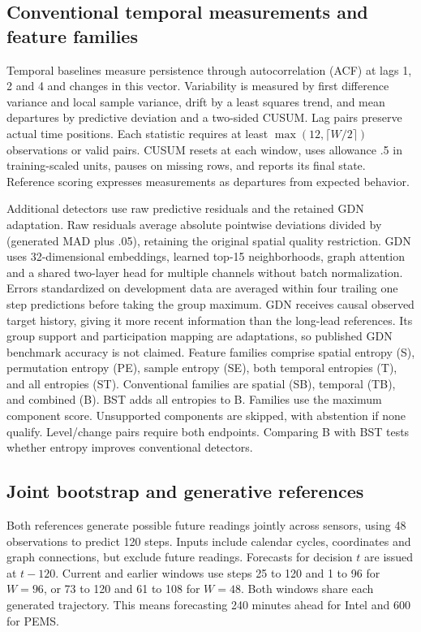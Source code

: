 \documentclass{llncs}
\begin{document}
\subsection{Conventional temporal measurements and feature families}
Temporal baselines measure persistence through autocorrelation (ACF) at lags
1, 2 and 4 and changes in this vector. Variability is measured by first difference
variance and local sample variance, drift by a least squares trend, and mean
departures by predictive deviation and a two-sided CUSUM. Lag pairs preserve
actual time positions. Each statistic requires at least
$\max(12,\lceil W/2\rceil)$ observations or valid pairs. CUSUM resets at each
window, uses allowance .5 in training-scaled units, pauses on missing rows,
and reports its final state. Reference scoring expresses measurements as
departures from expected behavior.

Additional detectors use raw predictive residuals and the retained GDN
adaptation. Raw residuals average absolute pointwise deviations divided by
(generated MAD plus .05), retaining the original spatial quality restriction.
GDN uses 32-dimensional embeddings, learned top-15 neighborhoods, graph
attention and a shared two-layer head for multiple channels without batch
normalization. Errors standardized on development data are averaged within
four trailing one step predictions before taking the group maximum. GDN receives
causal observed target history, giving it more recent information than the
long-lead references. Its group support and participation mapping are
adaptations, so published GDN benchmark accuracy is not claimed.
Feature families comprise spatial entropy (S), permutation entropy (PE),
sample entropy (SE), both temporal entropies (T), and all entropies (ST).
Conventional families are spatial (SB), temporal (TB), and combined (B).
BST adds all entropies to B. Families use the maximum component score.
Unsupported components are skipped, with abstention if none qualify.
Level/change pairs require both endpoints. Comparing B with BST tests
whether entropy improves conventional detectors.









\subsection{Joint bootstrap and generative references}
Both references generate possible future readings jointly across sensors,
using 48 observations to predict 120 steps. Inputs include calendar cycles,
coordinates and graph connections, but exclude future readings. Forecasts
for decision $t$ are issued at $t-120$. Current and earlier windows use
steps 25 to 120 and 1 to 96 for $W=96$, or 73 to 120 and 61 to 108 for $W=48$.
Both windows share each generated trajectory. This means forecasting
240 minutes ahead for Intel and 600 for PEMS.
\end{document}
